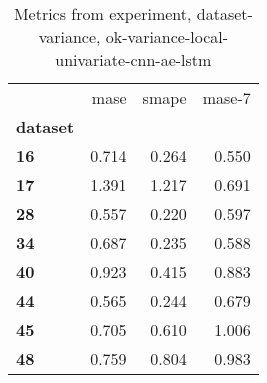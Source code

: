 \begin{table}[h]
\centering
\caption{Metrics from experiment, dataset-variance, ok-variance-local-univariate-cnn-ae-lstm}
\label{table:ok-variance-local-univariate-cnn-ae-lstm-dataset-variance}
\begin{tabular}{lrrr}
\toprule
{} &   mase &  smape &  mase-7 \\
\textbf{dataset} &        &        &         \\
\midrule
\textbf{16     } &  0.714 &  0.264 &   0.550 \\
\textbf{17     } &  1.391 &  1.217 &   0.691 \\
\textbf{28     } &  0.557 &  0.220 &   0.597 \\
\textbf{34     } &  0.687 &  0.235 &   0.588 \\
\textbf{40     } &  0.923 &  0.415 &   0.883 \\
\textbf{44     } &  0.565 &  0.244 &   0.679 \\
\textbf{45     } &  0.705 &  0.610 &   1.006 \\
\textbf{48     } &  0.759 &  0.804 &   0.983 \\
\bottomrule
\end{tabular}
\end{table}
